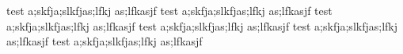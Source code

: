 test a;skfja;slkfjas;lfkj as;lfkasjf
test a;skfja;slkfjas;lfkj as;lfkasjf
test a;skfja;slkfjas;lfkj as;lfkasjf
test a;skfja;slkfjas;lfkj as;lfkasjf test a;skfja;slkfjas;lfkj as;lfkasjf test a;skfja;slkfjas;lfkj as;lfkasjf
